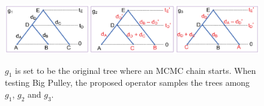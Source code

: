 \documentclass{bmcart}
\begin{document}
\begin{backmatter}
\begin{figure}[h!]
\includegraphics[width=12cm]{Fig08-sampleprior.eps}\\
\caption{
             $g_1$ is set to be the original tree where an MCMC chain starts. When testing Big Pulley, the proposed operator samples the trees among $g_1$, $g_2$ and $g_3$.}
\label{sampleprior}
\end{figure}

%


\end{backmatter}
\end{document}
